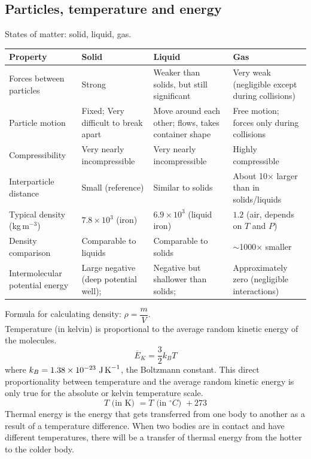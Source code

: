 \documentclass[a4paper,12pt]{article}
\begin{document}
\subsection{Particles, temperature and energy}
States of matter: solid, liquid, gas.
\begin{center}
\begin{tabularx}{\textwidth}{@{}|Y |Y |Y| Y|@{}}
\toprule
\textbf{Property} & \textbf{Solid} & \textbf{Liquid} & \textbf{Gas} \\
\midrule
Forces between particles & Strong & Weaker than solids, but still significant & Very weak (negligible except during collisions) \\\hline
Particle motion & Fixed; Very difficult to break apart & Move around each other; flows, takes container shape & Free motion; forces only during collisions \\\hline
Compressibility & Very nearly incompressible & Very nearly incompressible & Highly compressible \\\hline
Interparticle distance & Small (reference) & Similar to solids & About 10× larger than in solids/liquids \\\hline
Typical density (kg\,m$^{-3}$) & $7.8\times10^3$ (iron) & $6.9\times10^3$ (liquid iron) & $1.2$ (air, depends on $T$ and $P$) \\\hline
Density comparison & Comparable to liquids & Comparable to solids & $\sim$1000× smaller \\\hline
Intermolecular potential energy & Large negative (deep potential well); & Negative but shallower than solids; & Approximately zero (negligible interactions) \\
\bottomrule
\end{tabularx}
\end{center}
Formula for calculating density: $\rho=\dfrac{m}{V}$. \\
Temperature (in kelvin) is proportional to the average random kinetic energy of the molecules.
\[\overline{E}_K=\dfrac{3}{2}k_BT\]
where $k_B=1.38\times 10^{-23}\ \text{J\,K}^{-1}$, the Boltzmann constant. This direct proportionality between temperature and the average random kinetic energy is only true for the absolute or kelvin temperature scale.\\
\[T\text{ (in K) }=T\text{ (in $^\circ C$) }+273\]
Thermal energy is the energy that gets transferred from one body to another as a result of a temperature difference.
When two bodies are in contact and have different temperatures, there will be a transfer of thermal energy from the hotter to the colder body.
\end{document}
